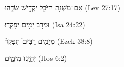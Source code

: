 
\begin{exe}

\ex\label{postMN_nondur_exs1}
\texthebrew{
אִם־מִשְּׁנַ֥ת הַיֹּבֵ֖ל יַקְדִּ֣ישׁ שָׂדֵ֑הוּ 
} (Lev 27:17)

\ex\label{postMN_nondur_exs2}
\texthebrew{
וּמֵרֹ֥ב יָמִ֖ים יִפָּקֵֽדוּ׃ 
} (Isa 24:22)

\ex\label{postMN_nondur_exs3}
\texthebrew{
מִיָּמִ֣ים רַבִּים֮ תִּפָּקֵד֒ 
} (Ezek 38:8)

\ex\label{postMN_nondur_exs4}
\texthebrew{
יְחַיֵּ֖נוּ מִיֹּמָ֑יִם 
} (Hos 6:2)

\end{exe}
